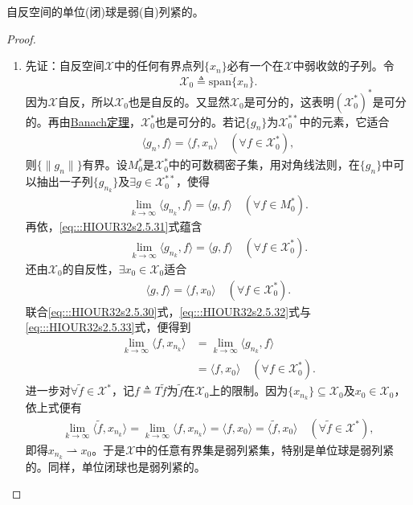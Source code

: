 \documentclass[../../main.tex]{subfiles}%
\begin{document}
\begin{theorem}\label{theorem:Eberlein-Smulian定理}
自反空间的单位(闭)球是弱(自)列紧的。
\end{theorem}
\begin{proof}
\begin{enumerate}[(1)]
\item 先证：自反空间$\mathscr{X}$中的任何有界点列$\{x_n\}$必有一个在$\mathscr{X}$中弱收敛的子列。令
$$\mathscr{X}_0\triangleq\overline{\mathrm{span}\{x_n\}}.$$
因为$\mathscr{X}$自反，所以$\mathscr{X}_0$也是自反的。又显然$\mathscr{X}_0$是可分的，这表明$(\mathscr{X}_0^*)^*$是可分的。再由\hyperref[theorem:泛函分析--Banach定理11]{Banach定理}，$\mathscr{X}_0^*$也是可分的。若记$\{g_n\}$为$\mathscr{X}_0^{**}$中的元素，它适合
\begin{align}
\langle g_n,f\rangle=\langle f,x_n\rangle\quad(\forall f\in\mathscr{X}_0^*),\label{eq:::HIOUR32s2.5.30}
\end{align}
则$\{\|g_n\|\}$有界。设$M_0^*$是$\mathscr{X}_0^*$中的可数稠密子集，用对角线法则，在$\{g_n\}$中可以抽出一子列$\{g_{n_k}\}$及$\exists g\in\mathscr{X}_0^{**}$，使得
\begin{align}
\lim\limits_{k\to\infty}\langle g_{n_k},f\rangle=\langle g,f\rangle\quad(\forall f\in M_0^*).\label{eq:::HIOUR32s2.5.31}
\end{align}
再依，\eqref{eq:::HIOUR32s2.5.31}式蕴含
\begin{align}
\lim\limits_{k\to\infty}\langle g_{n_k},f\rangle=\langle g,f\rangle\quad(\forall f\in\mathscr{X}_0^*).\label{eq:::HIOUR32s2.5.32}
\end{align}
还由$\mathscr{X}_0$的自反性，$\exists x_0\in\mathscr{X}_0$适合
\begin{align}
\langle g,f\rangle=\langle f,x_0\rangle\quad(\forall f\in\mathscr{X}_0^*).\label{eq:::HIOUR32s2.5.33}
\end{align}
联合\eqref{eq:::HIOUR32s2.5.30}式，\eqref{eq:::HIOUR32s2.5.32}式与\eqref{eq:::HIOUR32s2.5.33}式，便得到
\begin{align*}
\lim\limits_{k\to\infty}\langle f,x_{n_k}\rangle&=\lim\limits_{k\to\infty}\langle g_{n_k},f\rangle\\
&=\langle f,x_0\rangle\quad(\forall f\in\mathscr{X}_0^*).
\end{align*}
进一步对$\forall\widetilde{f}\in\mathscr{X}^*$，记$f\triangleq T\widetilde{f}$为$\widetilde{f}$在$\mathscr{X}_0$上的限制。因为$\{x_{n_k}\}\subseteq\mathscr{X}_0$及$x_0\in\mathscr{X}_0$，依上式便有
\begin{align*}
\lim\limits_{k\to\infty}\langle\widetilde{f},x_{n_k}\rangle=\lim\limits_{k\to\infty}\langle f,x_{n_k}\rangle
=\langle f,x_0\rangle=\langle\widetilde{f},x_0\rangle\quad(\forall\widetilde{f}\in\mathscr{X}^*),
\end{align*}
即得$x_{n_k}\rightharpoonup x_0$。于是$\mathscr{X}$中的任意有界集是弱列紧集，特别是单位球是弱列紧的。同样，单位闭球也是弱列紧的。


\end{enumerate}
\end{proof}
\end{document}
